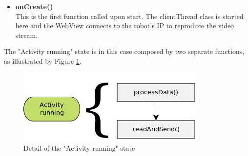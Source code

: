 	\begin{itemize}

	\item \textbf{onCreate()} \hfill \\
	This is the first function called upon start. The clientThread class is started here and the WebView connects to the robot's IP to reproduce the video stream.
	\\



	\end{itemize}

\bigskip

The "Activity running" state is in this case composed by two separate functions, as illustrated by Figure \ref{activityDetail}.

	\begin{figure}[H]
      \centering
      \includegraphics[scale=.8]{images/Diagrams/androidActivity.png}
      \caption{Detail of the "Activity running" state}
      \label{activityDetail}
	\end{figure}

\bigskip

